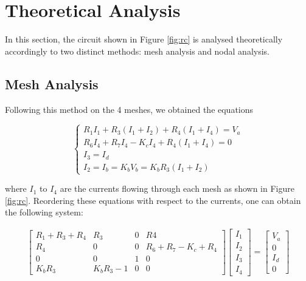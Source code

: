 \section{Theoretical Analysis}
\label{sec:analysis}

In this section, the circuit shown in Figure \ref{fig:rc} is analysed
theoretically accordingly to two distinct methods: mesh analysis and nodal analysis.

\subsection{Mesh Analysis}

Following this method on the 4 meshes, we obtained the equations

\begin{equation}
\begin{cases}
R_1 I_1 + R_3 (I_1+I_2)+R_4(I_1+I_4)=V_a\\
R_6 I_4 + R_7 I_4 -K_c I_4 + R_4 (I_1+I_4)=0\\
I_3=I_d\\
I_2=I_b=K_b V_b = K_b R_3 (I_1+I_2)
\end{cases}
\end{equation}

where $I_1$ to $I_4$ are the currents flowing through each mesh as shown in Figure \ref{fig:rc}. Reordering these equations with respect to the currents, one can obtain the following system:

\begin{gather}
    \begin{bmatrix}
     R_1+R_3+R_4 & R_3 & 0 & R4 \\
     R_4 & 0 & 0 & R_6+R_7-K_c+R_4\\
     0 & 0 & 1 & 0 \\
     K_b R_3 & K_b R_3 -1 & 0 & 0 
    \end{bmatrix}
    \begin{bmatrix}
     I_1\\
     I_2\\
     I_3\\
     I_4
    \end{bmatrix}
    =
    \begin{bmatrix}
     V_a\\
     0\\
     I_d\\
     0
    \end{bmatrix}
\end{gather}

